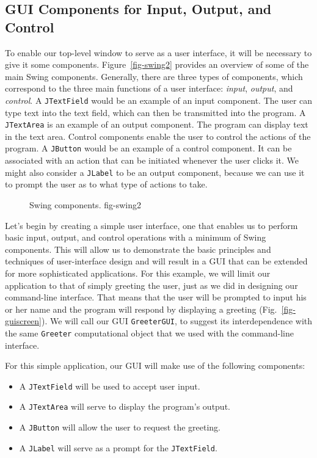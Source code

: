 \subsection{GUI Components for Input, Output, and Control}

To enable our top-level window to serve as a user interface, it will
be necessary to give it some components. Figure~\ref{fig-swing2}
provides an overview of some of the main Swing components. Generally,
there are three types of components, which correspond to the three
main functions of a user interface: {\em input}, {\em output}, and
{\em control}. A {\tt JTextField} would be an example of an input
component. The user can type text into the text field, which can then
be transmitted into the program. A {\tt JTextArea} is an example of an
output component. The program can display text in the text
area. Control components enable the user to control the actions of the
program. A {\tt JButton} would be an example of a control
component. It can be associated with an action that can be initiated
whenever the user clicks it. We might also consider a {\tt JLabel}
to be an output component, because we can use it to prompt the user as
to what type of actions to take.

\begin{figure}[tb]
{Swing components.
} {fig-swing2}

\end{figure}

Let's begin by creating a simple user interface, one that enables us
to perform basic input, output, and control operations with a minimum
of Swing components. This will allow us to demonstrate the basic
principles and techniques of user-interface design and will result in
a GUI that can be extended for more sophisticated applications. For
this example, we will limit our application to that of simply greeting
the user, just as we did in designing our command-line interface.
That means that the user will be prompted to input his or her name and
the program will respond by displaying a greeting
(Fig.~\ref{fig-guiscreen}).  We will call our GUI {\tt GreeterGUI},
to suggest its interdependence with the same {\tt Greeter}
computational object that we used with the command-line interface.

For this simple application, our GUI will make use of the following
components:

\begin{itemize}
\item A {\tt JTextField} will be used to accept user input.
\item A {\tt JTextArea} will serve to display the program's output.
\item A {\tt JButton} will allow the user to request the greeting.
\item A {\tt JLabel} will serve as a prompt for the {\tt JTextField}.
\end{itemize}

